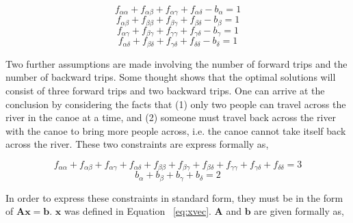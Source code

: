 \documentclass{article}
\begin{document}
\begin{equation} \label{eq:oppo-the-river-consts}
f_{\alpha \alpha} + f_{\alpha \beta} + f_{\alpha \gamma} + f_{\alpha \delta} - b_{\alpha} = 1
\end{equation}
\begin{equation*}
f_{\alpha \beta} + f_{\beta \beta} + f_{\beta \gamma} + f_{\beta \delta} - b_{\beta} = 1 
\end{equation*}
\begin{equation*}
f_{\alpha \gamma} + f_{\beta \gamma} + f_{\gamma \gamma} + f_{\gamma \delta} - b_{\gamma} = 1
\end{equation*}
\begin{equation*}
f_{\alpha \delta} + f_{\beta \delta} + f_{\gamma \delta} + f_{\delta \delta} - b_{\delta} = 1
\end{equation*}

Two further assumptions are made involving the number of forward trips and the number of backward trips.
Some thought shows that the optimal solutions will consist of three forward trips and two backward trips.
One can arrive at the conclusion by considering the facts that (1) only two people can travel across the river in the canoe at a time, and (2) someone must travel back across the river with the canoe to bring more people across, i.e. the canoe cannot take itself back across the river.
These two constraints are express formally as,

\begin{equation}
f_{\alpha \alpha} + f_{\alpha \beta} + f_{\alpha \gamma} + f_{\alpha \delta} + f_{\beta \beta} + f_{\beta \gamma} + f_{\beta \delta} + f_{\gamma \gamma} + f_{\gamma \delta} + f_{\delta \delta} = 3
\end{equation}
\begin{equation*}
b_{\alpha} + b_{\beta} + b_{\gamma} + b_{\delta} = 2
\end{equation*}

In order to express these constraints in standard form, they must be in the form of $\mathbf{A} \mathbf{x} = \mathbf{b}$.
$\mathbf{x}$ was defined in Equation ~\ref{eq:xvec}. $\mathbf{A}$ and $\mathbf{b}$ are given formally as,
\end{document}
